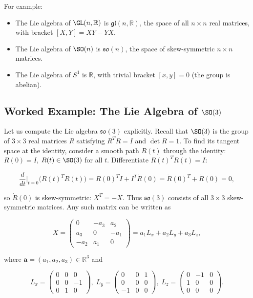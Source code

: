 For example:
\begin{itemize}
    \item The Lie algebra of $\GL(n,\mathbb{R})$ is $\mathfrak{gl}(n,\mathbb{R})$, the space of all $n \times n$ real matrices, with bracket $[X,Y] = XY - YX$.
    \item The Lie algebra of $\SO(n)$ is $\mathfrak{so}(n)$, the space of skew-symmetric $n \times n$ matrices.
    \item The Lie algebra of $S^1$ is $\mathbb{R}$, with trivial bracket $[x,y] = 0$ (the group is abelian).
\end{itemize}

\subsection{Worked Example: The Lie Algebra of $\SO(3)$}

Let us compute the Lie algebra $\mathfrak{so}(3)$ explicitly. Recall that $\SO(3)$ is the group of $3 \times 3$ real matrices $R$ satisfying $R^T R = I$ and $\det R = 1$. To find its tangent space at the identity, consider a smooth path $R(t)$ through the identity: $R(0) = I$, $R(t) \in \SO(3)$ for all $t$. Differentiate $R(t)^T R(t) = I$:

\[
\frac{d}{dt}\Big|_{t=0} \big(R(t)^T R(t)\big) = \dot R(0)^T I + I^T \dot R(0) = \dot R(0)^T + \dot R(0) = 0,
\]

so $\dot R(0)$ is skew-symmetric: $X^T = -X$. Thus $\mathfrak{so}(3)$ consists of all $3 \times 3$ skew-symmetric matrices. Any such matrix can be written as

\[
X = \begin{pmatrix}
0 & -a_3 & a_2 \\
a_3 & 0 & -a_1 \\
-a_2 & a_1 & 0
\end{pmatrix}
= a_1 L_x + a_2 L_y + a_3 L_z,
\]

where $\mathbf{a} = (a_1,a_2,a_3) \in \mathbb{R}^3$ and

\[
L_x = \begin{pmatrix} 0 & 0 & 0 \\ 0 & 0 & -1 \\ 0 & 1 & 0 \end{pmatrix},\;
L_y = \begin{pmatrix} 0 & 0 & 1 \\ 0 & 0 & 0 \\ -1 & 0 & 0 \end{pmatrix},\;
L_z = \begin{pmatrix} 0 & -1 & 0 \\ 1 & 0 & 0 \\ 0 & 0 & 0 \end{pmatrix}.
\]

